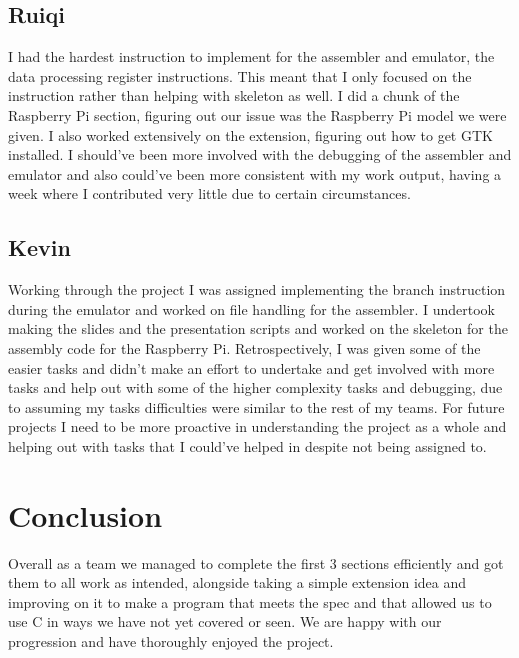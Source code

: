 \documentclass{article}
\begin{document}
\subsection{Ruiqi}

I had the hardest instruction to implement for the assembler and emulator, the data processing register instructions. This meant that I only focused on the instruction rather than helping with skeleton as well. I did a chunk of the Raspberry Pi section, figuring out our issue was the Raspberry Pi model we were given. I also worked extensively on the extension, figuring out how to get GTK installed. I should've been more involved with the debugging of the assembler and emulator and also could've been more consistent with my work output, having a week where I contributed very little due to certain circumstances.

\subsection{Kevin}

Working through the project I was assigned implementing the branch instruction during the emulator and worked on file handling for the assembler.  I undertook making the slides and the presentation scripts and worked on the skeleton for the assembly code for the Raspberry Pi. Retrospectively, I was given some of the easier tasks and didn't make an effort to undertake and get involved with more tasks and help out with some of the higher complexity tasks and debugging, due to assuming my tasks difficulties were similar to the rest of my teams. For future projects I need to be more proactive in understanding the project as a whole and helping out with tasks that I could've helped in despite not being assigned to.

\section{Conclusion}

Overall as a team we managed to complete the first 3 sections efficiently and got them to all work as intended, alongside taking a simple extension idea and improving on it to make a program that meets the spec and that allowed us to use C in ways we have not yet covered or seen. We are happy with our progression and have thoroughly enjoyed the project.
\end{document}
